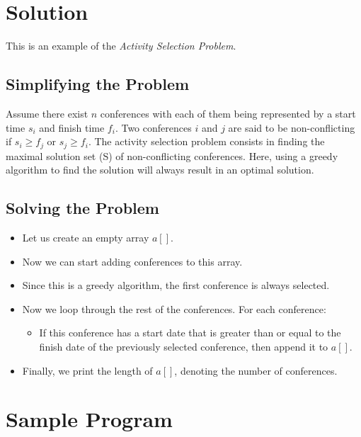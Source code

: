\documentclass[12pt]{report}
\begin{document}
\section*{Solution}
   This is an example of the \textit{Activity Selection Problem}.
  \subsection*{Simplifying the Problem}
  Assume there exist $n$ conferences with each of them being represented by a start time $s_i$ and finish time $f_i$. Two conferences $i$ and $j$ are said to be non-conflicting if $s_i \ge f_j$ or $s_j \ge f_i$. The activity selection problem consists in finding the maximal solution set (S) of non-conflicting conferences. Here, using a greedy algorithm to find the solution will always result in an optimal solution.
  \subsection*{Solving the Problem}
   \begin{itemize}
    \item Let us create an empty array $a[]$.
    \item Now we can start adding conferences to this array.
    \item Since this is a greedy algorithm, the first conference is always selected.
    \item Now we loop through the rest of the conferences. For each conference:
    \begin{itemize}
      \item If this conference has a start date that is greater than or equal to the finish date of the previously selected conference, then append it to $a[]$.
     \end{itemize}
     \item Finally, we print the length of $a[]$, denoting the number of conferences.
   \end{itemize}


	\section*{Sample Program}
	
	
\end{document}
